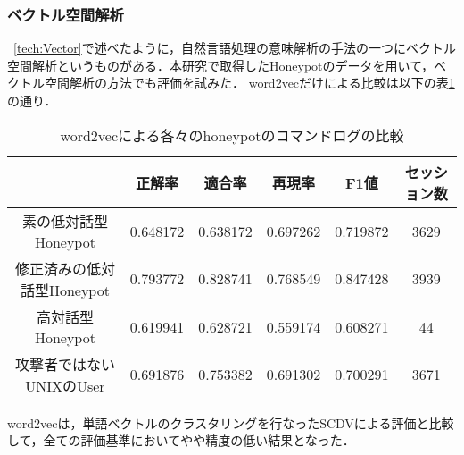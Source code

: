 \subsubsection{ベクトル空間解析}
~\ref{tech:Vector}で述べたように，自然言語処理の意味解析の手法の一つにベクトル空間解析というものがある．本研究で取得したHoneypotのデータを用いて，ベクトル空間解析の方法でも評価を試みた．
word2vecだけによる比較は以下の表\ref{table:word2veccompare}の通り．
\vspace{3mm}
\setlength{\myheighta}{10mm}
\begin{table}[h]
 \caption{word2vecによる各々のhoneypotのコマンドログの比較}
 \label{table:word2veccompare}
 \centering
  \begin{tabular}{|c||c|c|c|c|c|}
   \hline
   \parbox[c][\myheighta][c]{0cm}{}  & 正解率 & 適合率 & 再現率 & F1値 & セッション数\\
   \hline \hline 
     \parbox[c][\myheighta][c]{0cm}{} 素の低対話型Honeypot  & 0.648172 & 0.638172 & 0.697262 & 0.719872 & 3629\\
     \hline
     \parbox[c][\myheighta][c]{0cm}{} 修正済みの低対話型Honeypot  & 0.793772 & 0.828741 & 0.768549 & 0.847428 & 3939\\
     \hline
     \parbox[c][\myheighta][c]{0cm}{} 高対話型Honeypot  & 0.619941 & 0.628721 & 0.559174 & 0.608271 & 44\\
     \hline
     \parbox[c][\myheighta][c]{0cm}{} 攻撃者ではないUNIXのUser & 0.691876 & 0.753382 & 0.691302 & 0.700291& 3671\\
     \hline
  \end{tabular}
\end{table}
\vspace{7mm}
word2vecは，単語ベクトルのクラスタリングを行なったSCDVによる評価と比較して，全ての評価基準においてやや精度の低い結果となった．\\

